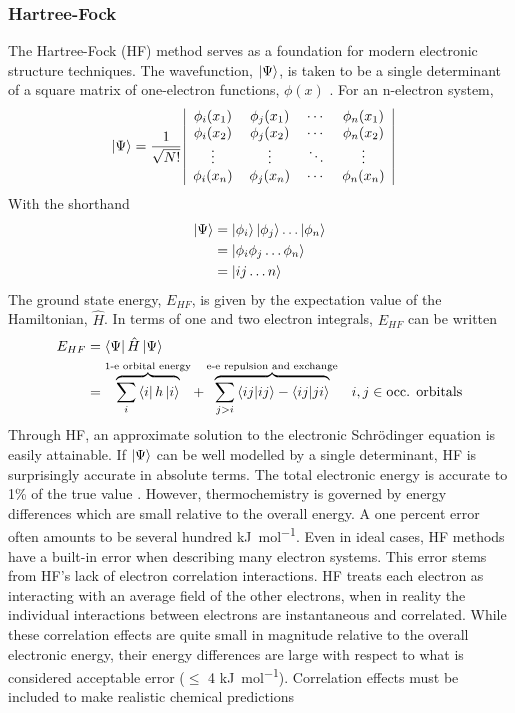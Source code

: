 \documentclass[letterpaper, 12pt]{article}
\begin{document}
\subsubsection{Hartree-Fock}
The Hartree-Fock (HF) method serves as a foundation for modern electronic structure techniques. The wavefunction, $\ket{\Psi}$, is taken to be a single determinant of a square matrix of one-electron functions, $\phi(x)$ \cite{HF}. For an n-electron system,
\begin{align}
\ket{\Psi}&= \frac{1}{\sqrt{N!}} \,
\begin{tabular}{|c c c c|}
$\phi_i(x_1)$ & $\phi_j(x_1)$& $\cdots$ & $\phi_n(x_1)$\\
$\phi_i(x_2)$ & $\phi_j(x_2)$&$\cdots$ & $\phi_n(x_2)$\\
$\vdots$ & $\vdots$& $\ddots$ & $\vdots$ \\
$\phi_i(x_n)$ & $\phi_j(x_n)$&$\cdots$  & $\phi_n(x_n)$\\
\end{tabular}
\end{align}
With the shorthand
\begin{align}
\ket{\Psi} &= \ket{\phi_i} \ket{\phi_j} \dots \ket{\phi_n} \\
&= \ket{\phi_i \phi_j \dots \phi_n} \\
&= \ket{ij \dots n} 
\end{align}
The ground state energy, $E_{HF}$, is given by the expectation value of the Hamiltonian, $\hat{H}$. In terms of one and two electron integrals, $E_{HF}$ can be written 
\begin{align}
E_{HF} &= \bra{\Psi} \hat{H} \ket{\Psi} \\ 
&=\overbrace{\sum_{i} \bra{i} h \ket{i}}^\text{1-e orbital energy} + \overbrace{\sum_{j>i} \braket{ij|ij}- \braket{ij|ji}}^\text{e-e repulsion and exchange} & i,j \in \text{occ. orbitals}
\end{align} 
Through HF, an approximate solution to the electronic Schr\"{o}dinger equation is easily attainable. If $\ket{\Psi}$ can be well modelled by a single determinant, HF is surprisingly accurate in absolute terms. The total electronic energy is accurate to 1\% of the true value \cite{Helgaker}. However, thermochemistry is governed by energy differences which are small relative to the overall energy. A one percent error often amounts to be several hundred \si{\kilo\joule\per\mol}.  Even in ideal cases, HF methods have a built-in error when describing many electron systems. This error stems from HF's lack of electron correlation interactions. HF treats each electron as interacting with an average field of the other electrons, when in reality the individual interactions between electrons are instantaneous and correlated. While these correlation effects are quite small in magnitude relative to the overall electronic energy, their energy differences are large with respect to what is considered acceptable error ($\leq$ 4 \si{\kilo\joule\per\mol}). Correlation effects must be included to make realistic chemical predictions 
\end{document}
